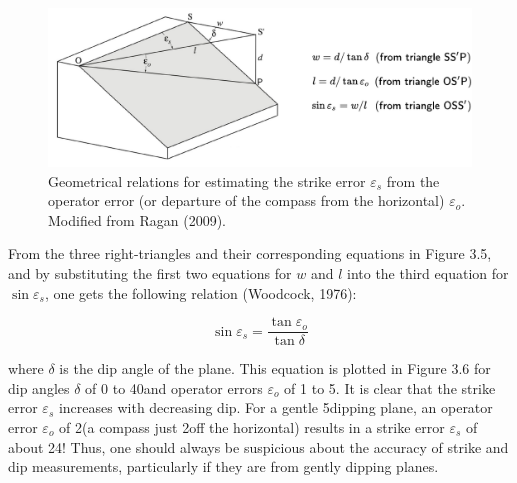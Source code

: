 \documentclass[a4paper , 12pt]{book}
\begin{document}
\begin{figure}[ht]
    \centering
    \includegraphics[width=13cm]{ch3f5.pdf}
    \caption{Geometrical relations for estimating the strike error $\varepsilon_s$ from the operator error (or departure of the compass from the horizontal) $\varepsilon_o$.  Modified from Ragan (2009).}
\end{figure}

From the three right-triangles and their corresponding equations in Figure 3.5, and by substituting the first two equations for $w$ and $l$ into the third equation for $\sin\varepsilon_s$, one gets the following relation (Woodcock, 1976):

\begin{equation}
    \sin\varepsilon_s = \frac{\tan\varepsilon_o}{\tan\delta}
\end{equation}

where $\delta$ is the dip angle of the plane. This equation is plotted in Figure 3.6 for dip angles $\delta$ of 0 to 40\degree\space and operator errors $\varepsilon_o$ of 1 to 5\degree. It is clear that the strike error $\varepsilon_s$ increases with decreasing dip. For a gentle 5\degree dipping plane, an operator error $\varepsilon_o$ of 2\degree\space (a compass just 2\degree\space off the horizontal) results in a strike error $\varepsilon_s$ of about 24\degree! Thus, one should always be suspicious about the accuracy of strike and dip measurements, particularly if they are from gently dipping planes.
\end{document}
